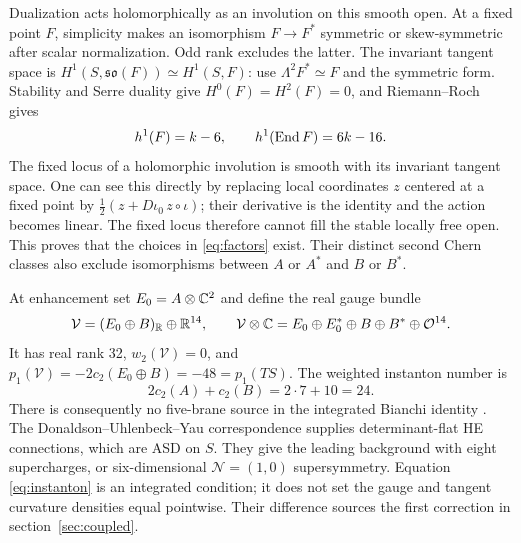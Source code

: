 Dualization acts holomorphically as an involution on this smooth open.
At a fixed point $F$, simplicity makes an isomorphism $F\to F^*$
symmetric or skew-symmetric after scalar normalization. Odd rank
excludes the latter. The invariant tangent space is
$H^1(S,\mathfrak{so}(F))\simeq H^1(S,F)$: use
$\Lambda^2F^*\simeq F$ and the symmetric form. Stability and Serre
duality give $H^0(F)=H^2(F)=0$, and Riemann--Roch gives
\begin{equation}\label{eq:selfdual-dim}
 h^1(F)=k-6,\qquad h^1(\operatorname{End} F)=6k-16.
\end{equation}
The fixed locus of a holomorphic involution is smooth with its invariant
tangent space. One can see this directly by replacing local coordinates
$z$ centered at a fixed point by
$\tfrac12(z+D\iota_0\,z\circ\iota)$; their derivative is the
identity and the action becomes linear. The fixed locus therefore
cannot fill the stable locally free open. This proves that the choices
in \eqref{eq:factors} exist. Their distinct second Chern classes also
exclude isomorphisms between $A$ or $A^*$ and $B$ or $B^*$.

At enhancement set $E_0=A\otimes\mathbb C^2$ and define the real gauge
bundle
\begin{equation}\label{eq:gauge-bundle}
 \mathcal V=(E_0\oplus B)_{\mathbb R}\oplus\mathbb R^{14},\qquad
 \mathcal V\otimes\mathbb C=E_0\oplus E_0^*\oplus B\oplus B^*\oplus\mathcal O^{14}.
\end{equation}
It has real rank 32, $w_2(\mathcal V)=0$, and
$p_1(\mathcal V)=-2c_2(E_0\oplus B)=-48=p_1(TS)$.
The weighted instanton number is
\begin{equation}\label{eq:instanton}
 2c_2(A)+c_2(B)=2\cdot7+10=24.
\end{equation}
There is consequently no five-brane source in the integrated Bianchi
identity \cite{honecker}. The Donaldson--Uhlenbeck--Yau correspondence
\cite{donaldson,uy} supplies determinant-flat HE connections, which are
ASD on $S$. They give the leading background with eight supercharges,
or six-dimensional $\mathcal N=(1,0)$ supersymmetry. Equation
\eqref{eq:instanton} is an integrated condition; it does not set the
gauge and tangent curvature densities equal pointwise. Their difference
sources the first correction in section~\ref{sec:coupled}.

